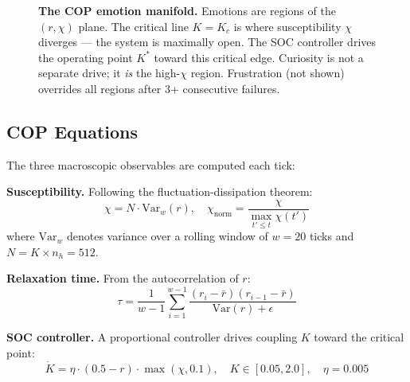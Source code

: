 \documentclass[11pt,a4paper,twocolumn]{article}
\begin{document}
\begin{figure}[t]
\caption{\textbf{The COP emotion manifold.} Emotions are regions of the $(r, \chi)$ plane.
The critical line $K = K_c$ is where susceptibility $\chi$ diverges --- the system is
maximally open. The SOC controller drives the operating point $K^*$ toward this critical
edge. Curiosity is not a separate drive; it \emph{is} the high-$\chi$ region.
Frustration (not shown) overrides all regions after 3+ consecutive failures.}
\label{fig:cop-manifold}
\end{figure}

\subsection{COP Equations}

The three macroscopic observables are computed each tick:

\textbf{Susceptibility.} Following the fluctuation-dissipation theorem:
\begin{equation}
\chi = N \cdot \mathrm{Var}_{w}(r), \quad \chi_{\mathrm{norm}} = \frac{\chi}{\max_{t' \leq t} \chi(t')}
\end{equation}
where $\mathrm{Var}_{w}$ denotes variance over a rolling window of $w=20$ ticks and $N = K \times n_h = 512$.

\textbf{Relaxation time.} From the autocorrelation of $r$:
\begin{equation}
\tau = \frac{1}{w-1}\sum_{i=1}^{w-1} \frac{(r_i - \bar{r})(r_{i-1} - \bar{r})}{\mathrm{Var}(r) + \epsilon}
\end{equation}

\textbf{SOC controller.} A proportional controller drives coupling $K$ toward the critical point:
\begin{equation}
\dot{K} = \eta \cdot (0.5 - r) \cdot \max(\chi, 0.1), \quad K \in [0.05, 2.0], \quad \eta = 0.005
\end{equation}
\end{document}
